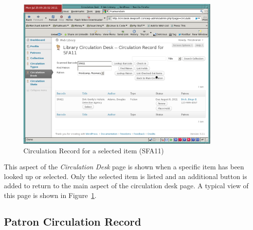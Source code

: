 \documentclass[letterpaper,twoside]{article}
\begin{document}
\begin{figure}[htbp]
\begin{centering}
\includegraphics[width=4in]{ItemCirculationRecord.png}
\caption{Circulation Record for a selected item (SFA11)}
\label{fig:ItemCirculationRecord}
\end{centering}
\end{figure}
This aspect of the \textit{Circulation Desk} page is shown when a
specific item has been looked up or selected.  Only the selected item is
listed and an additional button is added to return to the main
aspect of the circulation desk page.  A typical view of this page is
shown in Figure~\ref{fig:ItemCirculationRecord}.

\subsection{Patron Circulation Record}
\label{sect:PatronCirculationRecord}
\end{document}
